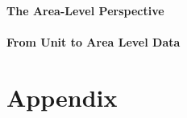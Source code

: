 \subsection{The Area-Level Perspective}


\subsection{From Unit to Area Level Data}



\appendix

\part{Appendix} %



\cleardoublepage %






